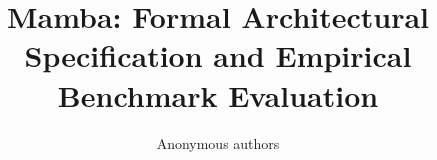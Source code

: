 \title{\textbf{Mamba: Formal Architectural Specification and Empirical Benchmark Evaluation}}

\author{Anonymous authors}
